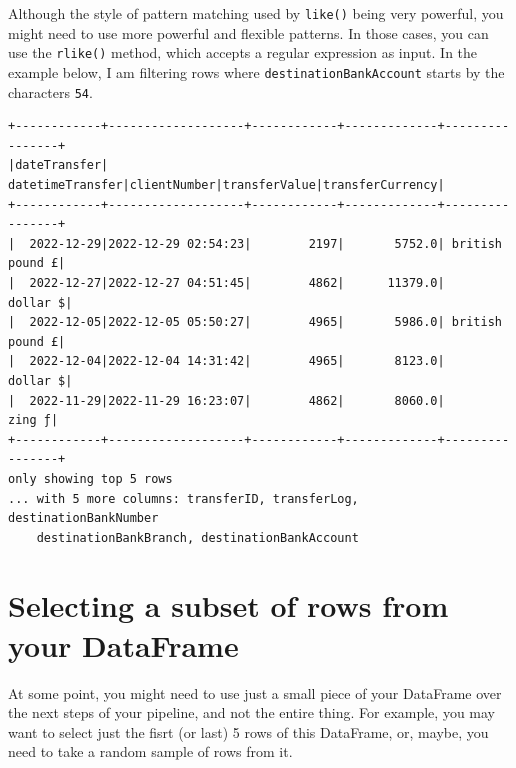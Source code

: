 \documentclass[
  11pt,
  letterpaper,
  DIV=11,
  numbers=noendperiod]{scrreprt}
\newenvironment{Shaded}{\begin{snugshade}}{\end{snugshade}}
\newcommand{\DecValTok}[1]{\textcolor[rgb]{0.68,0.00,0.00}{#1}}
\newcommand{\NormalTok}[1]{\textcolor[rgb]{0.00,0.23,0.31}{#1}}
\newcommand{\OperatorTok}[1]{\textcolor[rgb]{0.37,0.37,0.37}{#1}}
\newcommand{\SpecialCharTok}[1]{\textcolor[rgb]{0.37,0.37,0.37}{#1}}
\newcommand{\StringTok}[1]{\textcolor[rgb]{0.13,0.47,0.30}{#1}}
\begin{document}
Although the style of pattern matching used by \texttt{like()} being
very powerful, you might need to use more powerful and flexible
patterns. In those cases, you can use the \texttt{rlike()} method, which
accepts a regular expression as input. In the example below, I am
filtering rows where \texttt{destinationBankAccount} starts by the
characters \texttt{54}.

\begin{Shaded}
\end{Shaded}

\begin{verbatim}
+------------+-------------------+------------+-------------+----------------+
|dateTransfer|   datetimeTransfer|clientNumber|transferValue|transferCurrency|
+------------+-------------------+------------+-------------+----------------+
|  2022-12-29|2022-12-29 02:54:23|        2197|       5752.0| british pound £|
|  2022-12-27|2022-12-27 04:51:45|        4862|      11379.0|        dollar $|
|  2022-12-05|2022-12-05 05:50:27|        4965|       5986.0| british pound £|
|  2022-12-04|2022-12-04 14:31:42|        4965|       8123.0|        dollar $|
|  2022-11-29|2022-11-29 16:23:07|        4862|       8060.0|          zing ƒ|
+------------+-------------------+------------+-------------+----------------+
only showing top 5 rows
... with 5 more columns: transferID, transferLog, destinationBankNumber
    destinationBankBranch, destinationBankAccount
\end{verbatim}

\hypertarget{selecting-a-subset-of-rows-from-your-dataframe}{%
\section{Selecting a subset of rows from your
DataFrame}\label{selecting-a-subset-of-rows-from-your-dataframe}}

At some point, you might need to use just a small piece of your
DataFrame over the next steps of your pipeline, and not the entire
thing. For example, you may want to select just the fisrt (or last) 5
rows of this DataFrame, or, maybe, you need to take a random sample of
rows from it.
\end{document}
